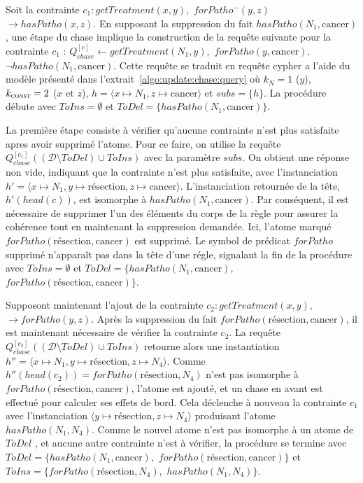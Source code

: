 \begin{example}
    \label{ex:update:chase:backward}
    Soit la contrainte $c_1 : getTreatment(x, y),$ $forPatho^-(y, z)$ $\to hasPatho(x, z)$.
    En supposant la suppression du fait $hasPatho(N_1, \text{cancer})$, une étape du chase implique la construction de la requête suivante pour la contrainte $c_1$ : $Q_{chase}^{[c]} \gets getTreatment(N_1, y),$ $forPatho(y, \text{cancer}),$ $\lnot hasPatho(N_1, \text{cancer})$.
    Cette requête se traduit en requête \gls{cypher} a l'aide du modèle présenté dans l'extrait~\ref{algo:update:chase:query} où $k_N = 1$ ($y$), $k_{\textsc{const}} = 2$ ($x$ et $z$), $h = \langle x \mapsto N_1, z \mapsto \text{cancer} \rangle$ et $subs = \{h\}$.
    La procédure débute avec $ToIns = \emptyset$ et $ToDel = \{hasPatho(N_1, \text{cancer})\}$.

    La première étape consiste à vérifier qu'aucune contrainte n'est plus satisfaite apres avoir supprimé l'atome.
    Pour ce faire, on utilise la requête $Q_{chase}^{[c_1]}((\mathcal{D} \setminus ToDel) \cup ToIns)$ avec la paramètre $subs$.
    On obtient une réponse non vide, indiquant que la contrainte n'est plus satisfaite, avec l'instanciation $h' = \langle x \mapsto N_1, y \mapsto \text{résection}, z \mapsto \text{cancer} \rangle$.
    L'instanciation retournée de la tête, $h'(head(c))$, est isomorphe à $hasPatho(N_1, \text{cancer})$.
    Par conséquent, il est nécessaire de supprimer l'un des éléments du corps de la règle pour assurer la cohérence tout en maintenant la suppression demandée.
    Ici, l'atome marqué $forPatho(\text{résection}, \text{cancer})$ est supprimé.
    Le symbol de prédicat $forPatho$ supprimé n'apparaît pas dans la tête d'une régle, signalant la fin de la procédure avec $ToIns = \emptyset$ et $ToDel = \{hasPatho(N_1, \text{cancer}),$ $forPatho(\text{résection}, \text{cancer})\}$.

    Supposont maintenant l'ajout de la contrainte $c_2 : getTreatment(x, y),$ $\to forPatho(y, z)$.
    Après la suppression du fait $forPatho(\text{résection}, \text{cancer})$, il est maintenant nécessaire de vérifier la contrainte $c_2$.
    La requête $Q_{chase}^{[c_2]}((\mathcal{D} \setminus ToDel) \cup ToIns)$ retourne alors une instantiation $h''= \langle x \mapsto N_1, y \mapsto \text{résection}, z \mapsto N_4 \rangle$.
    Comme $h''(head(c_2)) = forPatho(\text{résection}, N_4)$ n'est pas isomorphe à $forPatho(\text{résection}, \text{cancer})$, l'atome est ajouté, et un chase en avant est effectué pour calculer ses effets de bord.
    Cela déclenche à nouveau la contrainte $c_1$ avec l'instanciation $\langle y \mapsto \text{résection}, z \mapsto N_4 \rangle$ produisant l'atome $hasPatho(N_1, N_4)$.
    Comme le nouvel atome n'est pas isomorphe à un atome de $ToDel$ , et aucune autre contrainte n'est à vérifier, la procédure se termine avec $ToDel = \{hasPatho(N_1, \text{cancer}),$ $forPatho(\text{résection}, \text{cancer})\}$ et $ToIns = \{forPatho(\text{résection}, N_4),$ $hasPatho(N_1, N_4)\}$.
\end{example}
